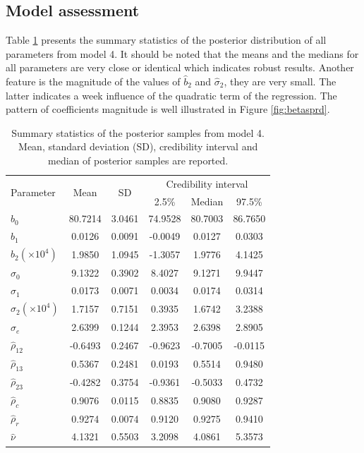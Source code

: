 \documentclass[a4paper]{article}   	%
\begin{document}
	
	\subsection{Model assessment}
	Table \ref{tb:resultModel4} presents the summary statistics of the posterior distribution of all parameters from model 4. It should be noted that the means and the medians for all parameters are very close or identical which indicates robust results. Another feature is the magnitude of the values of $\hat{b}_2$ and $\hat{\sigma}_2$, they are very small. The latter indicates a week influence of the quadratic term of the regression. The pattern of coefficients magnitude is well illustrated in Figure \ref{fig:betasprd}.
	
	\begin{table}[!htp]\centering
		\begin{tabular}{ l *{5}{c}} \toprule
			\multirow{2}{*}[-2pt]{Parameter}  &  \multirow{2}{*}[-2pt]{Mean}   & \multirow{2}{*}[-2pt]{SD}  &   \multicolumn{3}{c}{Credibility interval}  \\  \cmidrule{4-6} 
			&     &    &    2.5\%   &       Median  &      97.5\% \\ \midrule 
			$\hat{b}_0$   &  80.7214 &  3.0461 & 74.9528 & 80.7003& 86.7650    \\
			$\hat{b}_1$   &  0.0126 &   0.0091 &  -0.0049 &   0.0127 &  0.0303 \\
			$\hat{b}_2(\times 10^{4})$   & 1.9850 & 1.0945 & -1.3057 & 1.9776   &4.1425  \\
			$\hat{\sigma}_0$&  9.1322 & 0.3902  & 8.4027  & 9.1271  & 9.9447   \\
			$\hat{\sigma}_1$&  0.0173  & 0.0071  & 0.0034  & 0.0174  &  0.0314   \\
			$\hat{\sigma}_2(\times 10^{4})$&   1.7157  & 0.7151  & 0.3935  & 1.6742  & 3.2388   \\		
			$\hat{\sigma}_e$& 2.6399  & 0.1244  & 2.3953  & 2.6398  & 2.8905   \\
			$\hat{\rho}_{12}$& -0.6493 & 0.2467 & -0.9623 & -0.7005 & -0.0115 \\
			$\hat{\rho}_{13}$& 0.5367 & 0.2481 & 0.0193 & 0.5514 & 0.9480   \\
			$\hat{\rho}_{23}$&-0.4282 &  0.3754 & -0.9361 & -0.5033 &  0.4732  \\		
			$\hat{\rho}_c$   & 0.9076 & 0.0115 & 0.8835 & 0.9080 & 0.9287   \\
			$\hat{\rho}_r$   &  0.9274 & 0.0074&  0.9120& 0.9275 & 0.9410  \\
			$\hat{\nu}$ &  4.1321 & 0.5503 & 3.2098 & 4.0861 & 5.3573  \\
			\bottomrule
		\end{tabular}\caption{Summary statistics of the posterior samples from model 4. Mean, standard deviation (SD), credibility interval and median of posterior samples are reported. }\label{tb:resultModel4}
	\end{table}         
	
\end{document}
